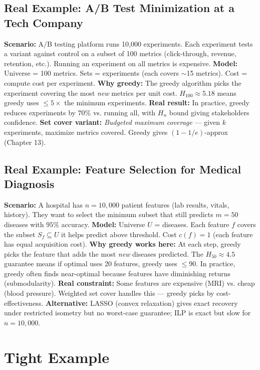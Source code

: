 \subsection*{Real Example: A/B Test Minimization at a Tech Company}
\textbf{Scenario:} A/B testing platform runs 10,000 experiments. Each experiment tests a variant against control on a subset of 100 metrics (click-through, revenue, retention, etc.). Running an experiment on all metrics is expensive.
\textbf{Model:} Universe = 100 metrics. Sets = experiments (each covers $\sim$15 metrics). Cost = compute cost per experiment.
\textbf{Why greedy:} The greedy algorithm picks the experiment covering the most \emph{new} metrics per unit cost. $H_{100} \approx 5.18$ means greedy uses $\leq 5\times$ the minimum experiments.
\textbf{Real result:} In practice, greedy reduces experiments by $70\%$ vs. running all, with $H_n$ bound giving stakeholders confidence.
\textbf{Set cover variant:} \emph{Budgeted maximum coverage} — given $k$ experiments, maximize metrics covered. Greedy gives $(1-1/e)$-approx (Chapter 13).

\subsection*{Real Example: Feature Selection for Medical Diagnosis}
\textbf{Scenario:} A hospital has $n=10,000$ patient features (lab results, vitals, history). They want to select the minimum subset that still predicts $m=50$ diseases with $95\%$ accuracy.
\textbf{Model:} Universe $U$ = diseases. Each feature $f$ covers the subset $S_f \subseteq U$ it helps predict above threshold. Cost $c(f) = 1$ (each feature has equal acquisition cost).
\textbf{Why greedy works here:} At each step, greedy picks the feature that adds the most \emph{new} diseases predicted. The $H_{50} \approx 4.5$ guarantee means if optimal uses 20 features, greedy uses $\leq 90$. In practice, greedy often finds near-optimal because features have diminishing returns (submodularity).
\textbf{Real constraint:} Some features are expensive (MRI) vs. cheap (blood pressure). Weighted set cover handles this — greedy picks by cost-effectiveness.
\textbf{Alternative:} LASSO (convex relaxation) gives exact recovery under restricted isometry but no worst-case guarantee; ILP is exact but slow for $n=10,000$.

\section{Tight Example}

